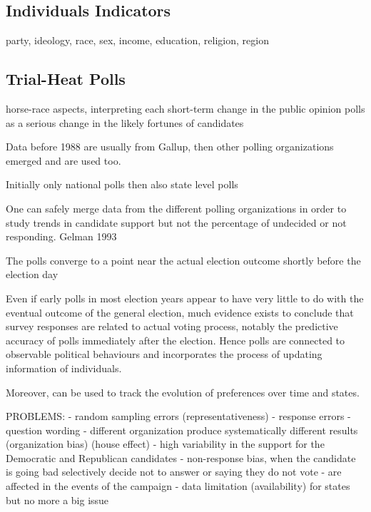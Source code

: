 \documentclass[
  12pt]{article}
\begin{document}
\hypertarget{individuals-indicators}{%
\subsection{Individuals Indicators}\label{individuals-indicators}}

party, ideology, race, sex, income, education, religion, region

\hypertarget{trial-heat-polls}{%
\subsection{Trial-Heat Polls}\label{trial-heat-polls}}

horse-race aspects, interpreting each short-term change in the public
opinion polls as a serious change in the likely fortunes of candidates

Data before 1988 are usually from Gallup, then other polling
organizations emerged and are used too.

Initially only national polls then also state level polls

One can safely merge data from the different polling organizations in
order to study trends in candidate support but not the percentage of
undecided or not responding. Gelman 1993

The polls converge to a point near the actual election outcome shortly
before the election day

Even if early polls in most election years appear to have very little to
do with the eventual outcome of the general election, much evidence
exists to conclude that survey responses are related to actual voting
process, notably the predictive accuracy of polls immediately after the
election. Hence polls are connected to observable political behaviours
and incorporates the process of updating information of individuals.

Moreover, can be used to track the evolution of preferences over time
and states.

PROBLEMS: - random sampling errors (representativeness) - response
errors - question wording - different organization produce
systematically different results (organization bias) (house effect) -
high variability in the support for the Democratic and Republican
candidates - non-response bias, when the candidate is going bad
selectively decide not to answer or saying they do not vote - are
affected in the events of the campaign - data limitation (availability)
for states but no more a big issue
\end{document}
